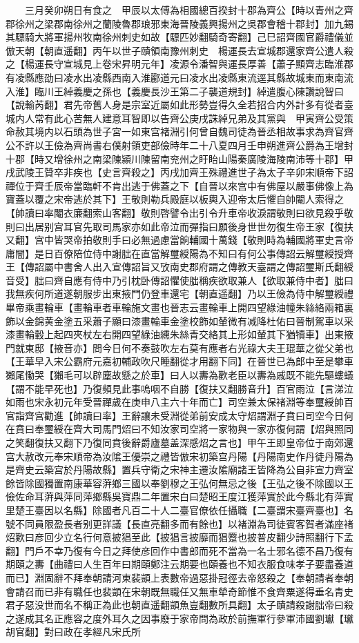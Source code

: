 　　三月癸卯朔日有食之　甲辰以太傅為相國總百揆封十郡為齊公【時以青州之齊郡徐州之梁郡南徐州之蘭陵魯郡琅邪東海晉陵義興揚州之吳郡會稽十郡封】加九錫其驃騎大將軍揚州牧南徐州刺史如故【驃匹妙翻騎奇寄翻】己巳詔齊國官爵禮儀並倣天朝【朝直遥翻】丙午以世子賾領南豫州刺史　楊運長去宣城郡還家齊公遣人殺之【楊運長守宣城見上卷宋昇明元年】凌源令潘智與運長厚善【蕭子顯齊志臨淮郡有凌縣應劭曰凌水出凌縣西南入淮酈道元曰凌水出凌縣東流逕其縣故城東而東南流入淮】臨川王綽義慶之孫也【義慶長沙王第二子襲道規封】綽遣腹心陳讚說智曰【說輸芮翻】君先帝舊人身是宗室近屬如此形勢豈得久全若招合内外計多有從者臺城内人常有此心苦無人建意耳智即以告齊公庚戌誅綽兄弟及其黨與　甲寅齊公受策命赦其境内以石頭為世子宮一如東宫褚淵引何曾自魏司徒為晉丞相故事求為齊官齊公不許以王儉為齊尚書右僕射領吏部儉時年二十八夏四月壬申朔進齊公爵為王增封十郡【時又增徐州之南梁陳潁川陳留南兖州之盱眙山陽秦廣陵海陵南沛等十郡】甲戌武陵王贊卒非疾也【史言齊殺之】丙戌加齊王殊禮進世子為太子辛卯宋順帝下詔禪位于齊壬辰帝當臨軒不肯出逃于佛蓋之下【自晉以來宫中有佛屋以嚴事佛像上為寶蓋以覆之宋帝逃於其下】王敬則勒兵殿庭以板輿入迎帝太后懼自帥閹人索得之【帥讀曰率閹衣廉翻索山客翻】敬則啓譬令出引令升車帝收淚謂敬則曰欲見殺乎敬則曰出居别宫耳官先取司馬家亦如此帝泣而彈指曰願後身世世勿復生帝王家【復扶又翻】宫中皆哭帝拍敬則手曰必無過慮當餉輔國十萬錢【敬則時為輔國將軍史言帝庸闇】是日百僚陪位侍中謝朏在直當解璽綬陽為不知曰有何公事傳詔云解璽綬授齊王【傳詔屬中書舍人出入宣傳詔旨又攷南史郡府謂之傳教天臺謂之傳詔璽斯氏翻綬音受】朏曰齊自應有侍中乃引枕卧傳詔懼使朏稱疾欲取兼人【欲取兼侍中者】朏曰我無疾何所道遂朝服步出東掖門仍登車還宅【朝直遥翻】乃以王儉為侍中解璽綬禮畢帝乘畫輪車【畫輪車者車輪施文畫也晉志云畫輪車上開四望綠油幢朱絲絡兩箱裏飾以金錦黄金塗五采蕭子顯曰漆畫輪車金塗校飾如輦微有减降杜佑曰晉制駕車以采漆畫輪轂上起四夾杖左右開四望綠油纁朱絲青交絡其上形如輦其下猶犢車】出東掖門就東邸【掖音亦】問今日何不奏鼓吹左右莫有應者右光祿大夫王琨華之從父弟也【王華早入宋公霸府元嘉初輔政吹尺睡翻從才用翻下同】在晉世已為郎中至是攀車獺尾慟哭【獺毛可以辟塵故懸之於車】曰人以夀為歡老臣以夀為戚既不能先驅螻蟻【謂不能早死也】乃復頻見此事嗚咽不自勝【復扶又翻勝音升】百官雨泣【言涕泣如雨也宋永初元年受晉禪歲在庚申八主六十年而亡】司空兼太保禇淵等奉璽綬帥百官詣齊宫勸進【帥讀曰率】王辭讓未受淵從弟前安成太守炤謂淵子賁曰司空今日何在賁曰奉璽綬在齊大司馬門炤曰不知汝家司空將一家物與一家亦復何謂【炤與照同之笑翻復扶又翻下乃復同賁後辭爵廬墓盖深感炤之言也】甲午王即皇帝位于南郊還宫大赦改元奉宋順帝為汝隂王優崇之禮皆倣宋初築宫丹陽【丹陽南史作丹徒丹陽為是齊史云築宫於丹陽故縣】置兵守衛之宋神主遷汝隂廟諸王皆降為公自非宣力齊室餘皆除國獨置南康華容蓱鄉三國以奉劉穆之王弘何無忌之後【王弘之後不除國以王儉佐命耳蓱與萍同萍鄉縣吳寶鼎二年置宋白曰楚昭王度江獲萍實於此今縣北有萍實里楚王臺因以名縣】除國者凡百二十人二臺官僚依任攝職【二臺謂宋臺齊臺也】名號不同員限盈長者别更詳議【長直亮翻多而有餘也】以褚淵為司徒賓客賀者滿座禇炤歎曰彦回少立名行何意披猖至此【披猖言披靡而猖蹷也披普皮翻少詩照翻行下孟翻】門戶不幸乃復有今日之拜使彦回作中書郎而死不當為一名士邪名德不昌乃復有期頤之夀【曲禮曰人生百年曰期頤鄭注云期要也頤養也不知衣服食味孝子要盡養道而已】淵固辭不拜奉朝請河東裴顗上表數帝過惡掛冠徑去帝怒殺之【奉朝請者奉朝會請召而已非有職任也裴顗在宋朝既無職任又無車犖奇節惟不食齊粟遂得垂名青史君子惡没世而名不稱正為此也朝直遥翻顗魚豈翻數所具翻】太子賾請殺謝朏帝曰殺之遂成其名正應容之度外耳久之因事廢于家帝問為政於前撫軍行參軍沛國劉瓛【瓛胡官翻】對曰政在孝經凡宋氏所